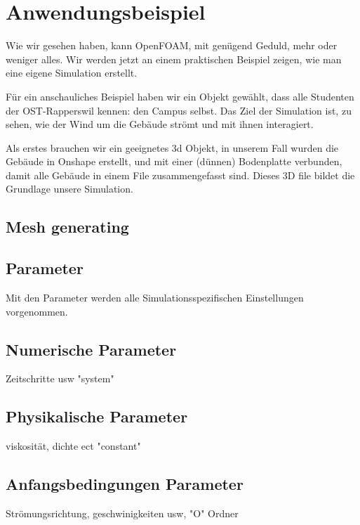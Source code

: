 %
%
%
%
\section{Anwendungsbeispiel
\label{openfoam:section:teil3}}
Wie wir gesehen haben, kann OpenFOAM, mit genügend Geduld, mehr oder weniger alles. 
Wir werden jetzt an einem praktischen Beispiel zeigen, wie man eine eigene Simulation erstellt.

Für ein anschauliches Beispiel haben wir ein Objekt gewählt, dass alle Studenten der OST-Rapperswil kennen: den Campus selbst.
Das Ziel der Simulation ist, zu sehen, wie der Wind um die Gebäude strömt und mit ihnen interagiert.

Als erstes brauchen wir ein geeignetes 3d Objekt, in unserem Fall wurden die Gebäude in Onshape erstellt, und mit einer (dünnen) Bodenplatte verbunden, damit alle Gebäude in einem File zusammengefasst sind.
Dieses 3D file bildet die Grundlage unsere Simulation.


\subsection{Mesh generating\label{openfoam:section:Mesh generating}}
\subsection{Parameter\label{openfoam:section:Parameter}}
Mit den Parameter werden alle Simulationsspezifischen Einstellungen vorgenommen.
\subsection{Numerische Parameter\label{openfoam:section:Numerische Parameter}}
Zeitschritte usw "system"
\subsection{Physikalische Parameter\label{openfoam:section:Physikalische Parameter}}
viskosität, dichte ect "constant"
\subsection{Anfangsbedingungen Parameter\label{openfoam:section:Anfangsbedingungen Parameter}}
Strömungsrichtung, geschwinigkeiten usw, "O" Ordner
